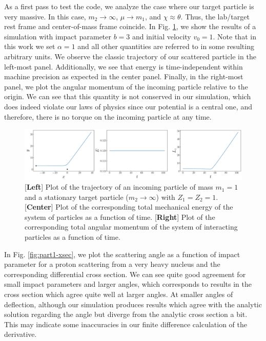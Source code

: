 As a first pass to test the code, we analyze the case where our target particle is very massive.
In this case, $m_2 \rightarrow \infty$, $\mu \rightarrow m_1$, and $\chi \approx \theta$.
Thus, the lab/target rest frame and center-of-mass frame coincide.
In Fig. \ref{fig:test-solver}, we show the results of a simulation with impact parameter $b = 3$ and initial velocity $v_0 = 1$.
Note that in this work we set $\alpha = 1$ and all other quantities are referred to in some resulting arbitrary units.
We observe the classic trajectory of our scattered particle in the left-most panel.
Additionally, we see that energy is time-independent within machine precision as expected in the center panel.
Finally, in the right-most panel, we plot the angular momentum of the incoming particle relative to the origin.
We can see that this quantity is not conserved in our simulation, which does indeed violate our laws of physics since our potential is a central one, and therefore, there is no torque on the incoming particle at any time.

\begin{figure}[h!tb]
    \centering
    \includegraphics[width=\textwidth]{test_solver.pdf}
    \caption{[\textbf{Left}] Plot of the trajectory of an incoming particle of mass $m_1 = 1$ and a stationary target particle ($m_2 \rightarrow \infty$) with $Z_1 = Z_2 = 1$. [\textbf{Center}] Plot of the corresponding total mechanical energy of the system of particles as a function of time. [\textbf{Right}] Plot of the corresponding total angular momentum of the system of interacting particles as a function of time.}
    \label{fig:test-solver}
\end{figure}


In Fig. \ref{fig:part1-xsec}, we plot the scattering angle as a function of impact parameter for a proton scattering from a very heavy nucleus and the corresponding differential cross section.
We can see quite good agreement for small impact parameters and larger angles, which corresponds to results in the cross section which agree quite well at larger angles.
At smaller angles of deflection, although our simulation produces results which agree with the analytic solution regarding the angle but diverge from the analytic cross section a bit.
This may indicate some inaccuracies in our finite difference calculation of the derivative.


